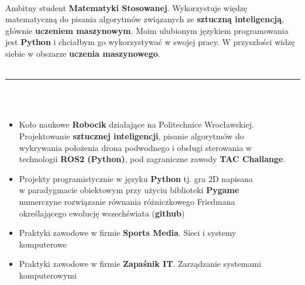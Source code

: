 \documentclass[10pt]{article}
\begin{document}
    \begin{minipage}[t]{0.60\textwidth}
        \fontsize{10pt}{10pt}
        \\


        Ambitny student \textbf{Matematyki Stosowanej}. Wykorzystuje więdzę matematyczną 
        do pisania algorytmów związanych ze \textbf{sztuczną inteligencją}, 
        głównie \textbf{uczeniem maszynowym}. Moim ulubionym językiem
        programowania jest \textbf{Python} i chciałbym go wykorzystywać w swojej pracy.
        W przyszłości widzę siebie w obszarze \textbf{uczenia maszynowego}. \\ \\
        \rule{11cm}{1pt} \\ \\
        \fontsize{10pt}{10pt}
        \begin{itemize}[leftmargin=*]
            \setlength{\parskip}{0pt}
            \item Koło naukowe \textbf{Robocik} działające na Politechnice Wrocławskiej. \\
            Projektowanie \textbf{sztucznej inteligencji}, pisanie algorytmów do \\
            wykrywania położenia drona podwodnego i obsługi sterowania w \\ technologii \textbf{ROS2 (Python)},
            pod zagraniczne zawody \textbf{TAC Challange}.
            \item Projekty programistycznie w języku \textbf{Python} tj. gra 2D napisana \\
            w paradygmacie obiektowym przy użyciu biblioteki \textbf{Pygame} \\
            numerczyne rozwiązanie równania różniczkowego Friedmana \\
            określającego ewolucję wszechświata  (\textbf{github})
            \item Praktyki zawodowe w firmie \textbf{Sports Media}. Sieci i systemy \\ komputerowe
            \item Praktyki zawodowe w firmie \textbf{Zapaśnik IT}. Zarządzanie systemami  \\komputerowymi

\end{itemize}
\end{minipage}
\end{document}
